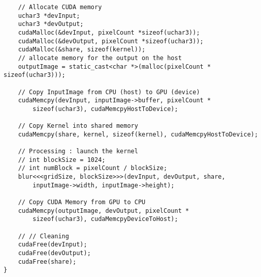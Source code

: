 \documentclass{article}
\begin{document}
\begin{enumerate}
\begin{verbatim}
    // Allocate CUDA memory
    uchar3 *devInput;
    uchar3 *devOutput;
    cudaMalloc(&devInput, pixelCount *sizeof(uchar3));
    cudaMalloc(&devOutput, pixelCount *sizeof(uchar3));
    cudaMalloc(&share, sizeof(kernel));
    // allocate memory for the output on the host
    outputImage = static_cast<char *>(malloc(pixelCount * sizeof(uchar3)));  

    // Copy InputImage from CPU (host) to GPU (device)
    cudaMemcpy(devInput, inputImage->buffer, pixelCount * 
        sizeof(uchar3), cudaMemcpyHostToDevice);

    // Copy Kernel into shared memory
    cudaMemcpy(share, kernel, sizeof(kernel), cudaMemcpyHostToDevice);

    // Processing : launch the kernel
    // int blockSize = 1024;
    // int numBlock = pixelCount / blockSize;  
    blur<<<gridSize, blockSize>>>(devInput, devOutput, share, 
        inputImage->width, inputImage->height);

    // Copy CUDA Memory from GPU to CPU
    cudaMemcpy(outputImage, devOutput, pixelCount * 
        sizeof(uchar3), cudaMemcpyDeviceToHost);   

    // // Cleaning
    cudaFree(devInput);
    cudaFree(devOutput);
    cudaFree(share);
}
\end{verbatim}

\end{enumerate}
\end{document}
